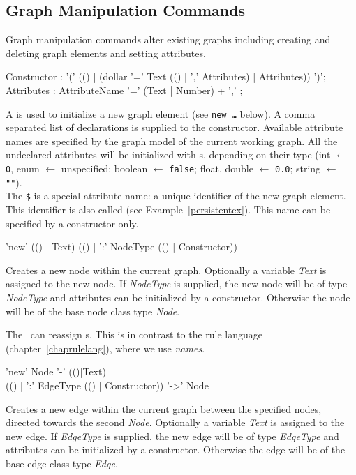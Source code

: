 \subsection{Graph Manipulation Commands}
\label{mani}
Graph manipulation commands alter existing graphs including creating and deleting graph elements and setting attributes.

\begin{rail}
  Constructor : '(' (() | (dollar '=' Text (() | ',' Attributes) | Attributes)) ')';
  Attributes : AttributeName '=' (Text | Number) + ',' ;
\end{rail}\indexmain{\texttt{\$}}
A  is used to initialize a new graph element (see \texttt{new \dots} below). A comma separated list of  declarations is supplied to the constructor. Available attribute names are specified by the graph model of the current working graph. All the undeclared attributes will be initialized with s, depending on their type (int $\leftarrow$ \texttt{0}, enum $\leftarrow$ unspecified; boolean $\leftarrow$ \texttt{false}; float, double $\leftarrow$ \texttt{0.0}; string $\leftarrow$ \texttt{""}).\\
The \texttt{\$} is a special attribute name: a unique identifier of the new graph element. This identifier is also called  (see Example~\ref{persistentex}). This name can be specified by a constructor only.

\begin{rail}
  'new' (() | Text) (() | ':' NodeType (() | Constructor))
\end{rail}
Creates a new node within the current graph. Optionally a variable \emph{Text} is assigned to the new node. If \emph{NodeType} is supplied, the new node will be of type \emph{NodeType} and attributes can be initialized by a constructor. Otherwise the node will be of the base node class type \emph{Node}.
\begin{note}
The \GrShell\ can reassign s. 
This is in contrast to the rule language (chapter~\ref{chaprulelang}), where we use \emph{names}.
\end{note}

\begin{rail}
  'new' Node '-' (()|Text) \\ (() | ':' EdgeType (() | Constructor)) '->' Node
\end{rail}
Creates a new edge within the current graph between the specified nodes, directed towards the second \emph{Node}. Optionally a variable \emph{Text} is assigned to the new edge. If \emph{EdgeType} is supplied, the new edge will be of type \emph{EdgeType} and attributes can be initialized by a constructor. Otherwise the edge will be of the base edge class type \emph{Edge}.

